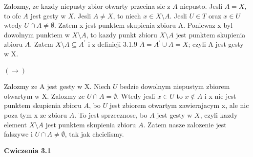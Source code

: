 \documentclass{article}
\begin{document}
Zalozmy, ze kazdy niepusty zbior otwarty przecina sie z $A$ niepusto. Jesli $A=X$, to ofc $A$ jest gesty w $X$. Jesli $A \neq X$, to niech $x \in X\setminus A$. Jesli $U \in T$ oraz $x \in U$ wtedy $U \cap A \neq \emptyset$. Zatem x jest punktem skupienia zbioru A. Poniewaz x byl dowolnym punktem w $X\setminus A$, to kazdy punkt zbioru $X\setminus A$ jest punktem skupienia zbioru $A$. Zatem $X\setminus A \subseteq A^{\prime}$ i z definicji 3.1.9 $\overline{A} = A^{\prime} \cup A = X$; czyli A jest gesty w X.

$(\rightarrow)$

Zalozmy ze A jest gesty w X. Niech $U$ bedzie dowolnym niepustym zbiorem otwartym w X. Zalozmy ze $U\cap A = \emptyset$. Wtedy jesli $x\in U$ to $x \not\in A$ i x nie jest punktem skupienia zbioru $A$, bo $U$ jest zbiorem otwartym zawierajacym x, ale nic poza tym x ze zbioru $A$. To jest sprzecznosc, bo $A$ jest gesty w $X$, czyli kazdy element $X\setminus A$ jest punktem skupienia zbioru $A$. Zatem nasze zalozenie jest falszywe i $U\cap A \neq \emptyset$, tak jak chcielismy.

\textbf{Cwiczenia 3.1}

\hrulefill
\end{document}
